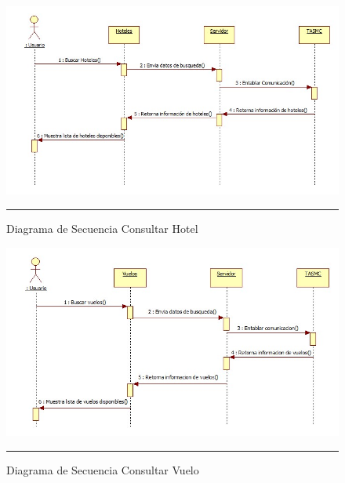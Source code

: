 \begin{figure}[H]
	\centering
		\includegraphics[width=1\textwidth]{Figuras/ConsultaHoteles.jpg}
		\rule{30em}{0.5pt}
	\caption[Diagrama de Secuencia Consultar Hotel]{Diagrama de Secuencia Consultar Hotel}
	\label{fig:secConsultarHotel}
\end{figure}

\begin{figure}[H]
	\centering
		\includegraphics[width=1\textwidth]{Figuras/ConsultaVuelos.jpg}
		\rule{30em}{0.5pt}
	\caption[Diagrama de Secuencia Consultar Vuelo]{Diagrama de Secuencia Consultar Vuelo}
	\label{fig:secConsultarVuelo}
\end{figure}

